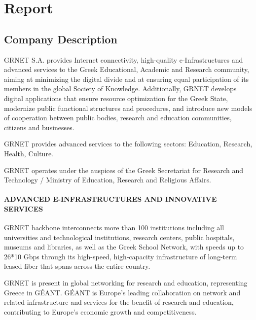 
\chapter{Report}

\section{Company Description}
GRNET S.A. provides Internet connectivity,
high-quality e-Infrastructures and advanced services to the Greek Educational,
Academic and Research community,
aiming at minimizing the digital divide and
at ensuring equal participation of its members
in the global Society of Knowledge.
Additionally, GRNET develops digital applications that
ensure resource optimization for the Greek State,
modernize public functional structures and procedures,
and introduce new models of cooperation between public bodies,
research and education communities, citizens and businesses.\par

GRNET provides advanced services to the following sectors:
Education, Research, Health, Culture.\par

GRNET operates under the auspices of
the Greek Secretariat for Research and Technology /
Ministry of Education, Research and Religious Affairs.

\subsubsection{ADVANCED E-INFRASTRUCTURES AND INNOVATIVE SERVICES}
GRNET backbone interconnects more than 100 institutions including
all universities and technological institutions,
research centers, public hospitals, museums and libraries,
as well as the Greek School Network,
with speeds up to 26*10 Gbps through its high-speed,
high-capacity infrastructure of long-term leased fiber
that spans across the entire country.\par

GRNET is present in global networking for research and education,
representing Greece in GÉANT.
GÉANT is Europe’s leading collaboration on network
and related infrastructure and services
for the benefit of research and education,
contributing to Europe’s economic growth and competitiveness.

